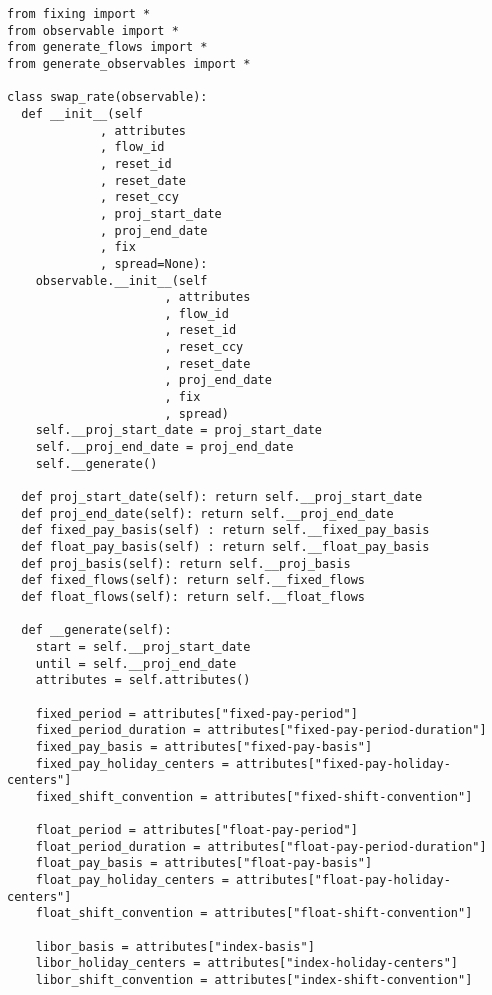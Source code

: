 \begin{verbatim}
from fixing import *
from observable import *
from generate_flows import *
from generate_observables import *

class swap_rate(observable):
  def __init__(self
             , attributes
             , flow_id
             , reset_id
             , reset_date
             , reset_ccy
             , proj_start_date
             , proj_end_date
             , fix
             , spread=None):
    observable.__init__(self
                      , attributes
                      , flow_id
                      , reset_id
                      , reset_ccy
                      , reset_date
                      , proj_end_date
                      , fix
                      , spread)
    self.__proj_start_date = proj_start_date
    self.__proj_end_date = proj_end_date
    self.__generate()

  def proj_start_date(self): return self.__proj_start_date
  def proj_end_date(self): return self.__proj_end_date
  def fixed_pay_basis(self) : return self.__fixed_pay_basis
  def float_pay_basis(self) : return self.__float_pay_basis
  def proj_basis(self): return self.__proj_basis
  def fixed_flows(self): return self.__fixed_flows
  def float_flows(self): return self.__float_flows

  def __generate(self):
    start = self.__proj_start_date
    until = self.__proj_end_date
    attributes = self.attributes()

    fixed_period = attributes["fixed-pay-period"]
    fixed_period_duration = attributes["fixed-pay-period-duration"]
    fixed_pay_basis = attributes["fixed-pay-basis"]
    fixed_pay_holiday_centers = attributes["fixed-pay-holiday-centers"]
    fixed_shift_convention = attributes["fixed-shift-convention"]

    float_period = attributes["float-pay-period"]
    float_period_duration = attributes["float-pay-period-duration"]
    float_pay_basis = attributes["float-pay-basis"]
    float_pay_holiday_centers = attributes["float-pay-holiday-centers"]
    float_shift_convention = attributes["float-shift-convention"]

    libor_basis = attributes["index-basis"]
    libor_holiday_centers = attributes["index-holiday-centers"]
    libor_shift_convention = attributes["index-shift-convention"]


\end{verbatim}
